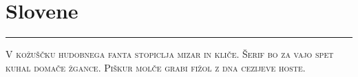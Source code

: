 \vspace{-1em}\section*{\checkyes Slovene}
\vspace{-.5em}\hrule\vspace{.5em}
\noindent\textsc{
V kožuščku hudobnega fanta stopiclja mizar in kliče.
Šerif bo za vajo spet kuhal domače žgance.
Piškur molče grabi fižol z dna cezijeve hoste.}